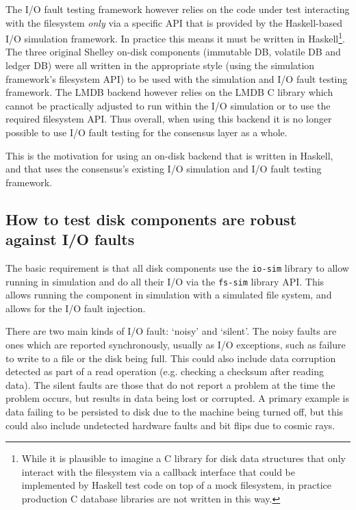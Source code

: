\documentclass[11pt,a4paper]{article}
\begin{document}
The I/O fault testing framework however relies on the code under test
interacting with the filesystem \emph{only} via a specific API that is provided by the Haskell-based I/O simulation framework. In practice this means it must
be written in Haskell\footnote{While it is plausible to imagine a C library for
disk data structures that only interact with the filesystem via a callback
interface that could be implemented by Haskell test code on top of a mock
filesystem, in practice production C database libraries are not written in this
way.}. The three original Shelley on-disk components (immutable DB, volatile DB
and ledger DB) were all written in the appropriate style (using the simulation
framework's filesystem API) to be used with the simulation and I/O fault testing
framework. The LMDB backend however relies on the LMDB C library which cannot
be practically adjusted to run within the I/O simulation or to use the required
filesystem API. Thus overall, when using this backend it is no longer possible
to use I/O fault testing for the consensus layer as a whole.

This is the motivation for using an on-disk backend that is written in Haskell,
and that uses the consensus's existing I/O simulation and I/O fault testing
framework.

\subsection{How to test disk components are robust against I/O faults}
\label{sec:how-to-test-disk-components-are-robust-against-io-faults}

The basic requirement is that all disk components use the \texttt{io-sim}
library to allow running in simulation and do all their I/O via the
\texttt{fs-sim} library API. This allows running the component in simulation
with a simulated file system, and allows for the I/O fault injection.

There are two main kinds of I/O fault: `noisy' and `silent'. The noisy faults
are ones which are reported synchronously, usually as I/O exceptions, such as
failure to write to a file or the disk being full. This could also include
data corruption detected as part of a read operation (e.g. checking a checksum
after reading data). The silent faults are those that do not report a problem
at the time the problem occurs, but results in data being lost or corrupted.
A primary example is data failing to be persisted to disk due to the machine
being turned off, but this could also include undetected hardware faults and
bit flips due to cosmic rays.
\end{document}
